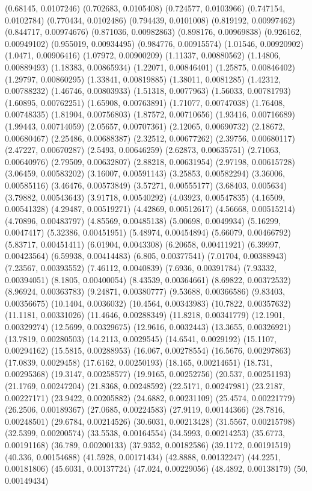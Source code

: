 {(0.68145, 0.0107246)
(0.702683, 0.0105408)
(0.724577, 0.0103966)
(0.747154, 0.0102784)
(0.770434, 0.0102486)
(0.794439, 0.0101008)
(0.819192, 0.00997462)
(0.844717, 0.00974676)
(0.871036, 0.00982863)
(0.898176, 0.00969838)
(0.926162, 0.00949102)
(0.955019, 0.00934495)
(0.984776, 0.00915574)
(1.01546, 0.00920902)
(1.0471, 0.00906416)
(1.07972, 0.00900209)
(1.11337, 0.00880562)
(1.14806, 0.00889493)
(1.18383, 0.00865934)
(1.22071, 0.00846401)
(1.25875, 0.00846402)
(1.29797, 0.00860295)
(1.33841, 0.00819885)
(1.38011, 0.0081285)
(1.42312, 0.00788232)
(1.46746, 0.00803933)
(1.51318, 0.0077963)
(1.56033, 0.00781793)
(1.60895, 0.00762251)
(1.65908, 0.00763891)
(1.71077, 0.00747038)
(1.76408, 0.00748335)
(1.81904, 0.00756803)
(1.87572, 0.00710656)
(1.93416, 0.00716689)
(1.99443, 0.00714059)
(2.05657, 0.00707361)
(2.12065, 0.00690732)
(2.18672, 0.00680467)
(2.25486, 0.00688387)
(2.32512, 0.00677262)
(2.39756, 0.00680117)
(2.47227, 0.00670287)
(2.5493, 0.00646259)
(2.62873, 0.00635751)
(2.71063, 0.00640976)
(2.79509, 0.00632807)
(2.88218, 0.00631954)
(2.97198, 0.00615728)
(3.06459, 0.00583202)
(3.16007, 0.00591143)
(3.25853, 0.00582294)
(3.36006, 0.00585116)
(3.46476, 0.00573849)
(3.57271, 0.00555177)
(3.68403, 0.005634)
(3.79882, 0.00543643)
(3.91718, 0.00540292)
(4.03923, 0.00547835)
(4.16509, 0.00541328)
(4.29487, 0.00519271)
(4.42869, 0.00512617)
(4.56668, 0.00515214)
(4.70896, 0.00483797)
(4.85569, 0.00485138)
(5.00698, 0.0049934)
(5.16299, 0.0047417)
(5.32386, 0.00451951)
(5.48974, 0.00454894)
(5.66079, 0.00466792)
(5.83717, 0.00451411)
(6.01904, 0.0043308)
(6.20658, 0.00411921)
(6.39997, 0.00423564)
(6.59938, 0.00414483)
(6.805, 0.00377541)
(7.01704, 0.00388943)
(7.23567, 0.00393552)
(7.46112, 0.0040839)
(7.6936, 0.00391784)
(7.93332, 0.00394051)
(8.1805, 0.00400054)
(8.43539, 0.00364661)
(8.69822, 0.00372532)
(8.96924, 0.00363783)
(9.24871, 0.00380777)
(9.53688, 0.00366586)
(9.83403, 0.00356675)
(10.1404, 0.0036032)
(10.4564, 0.00343983)
(10.7822, 0.00357632)
(11.1181, 0.00331026)
(11.4646, 0.00288349)
(11.8218, 0.00341779)
(12.1901, 0.00329274)
(12.5699, 0.00329675)
(12.9616, 0.0032443)
(13.3655, 0.00326921)
(13.7819, 0.00280503)
(14.2113, 0.0029545)
(14.6541, 0.0029192)
(15.1107, 0.00294162)
(15.5815, 0.00288953)
(16.067, 0.00278554)
(16.5676, 0.00297863)
(17.0839, 0.0029458)
(17.6162, 0.00250193)
(18.165, 0.00214651)
(18.731, 0.00295368)
(19.3147, 0.00258577)
(19.9165, 0.00252756)
(20.537, 0.00251193)
(21.1769, 0.00247204)
(21.8368, 0.00248592)
(22.5171, 0.00247981)
(23.2187, 0.00227171)
(23.9422, 0.00205882)
(24.6882, 0.00231109)
(25.4574, 0.00221779)
(26.2506, 0.00189367)
(27.0685, 0.00224583)
(27.9119, 0.00144366)
(28.7816, 0.00248501)
(29.6784, 0.00214526)
(30.6031, 0.00213428)
(31.5567, 0.00215798)
(32.5399, 0.00200574)
(33.5538, 0.00164554)
(34.5993, 0.00214253)
(35.6773, 0.00191168)
(36.789, 0.00200133)
(37.9352, 0.00182586)
(39.1172, 0.00191519)
(40.336, 0.00154688)
(41.5928, 0.00171434)
(42.8888, 0.00132247)
(44.2251, 0.00181806)
(45.6031, 0.00137724)
(47.024, 0.00229056)
(48.4892, 0.00138179)
(50, 0.00149434)
}

